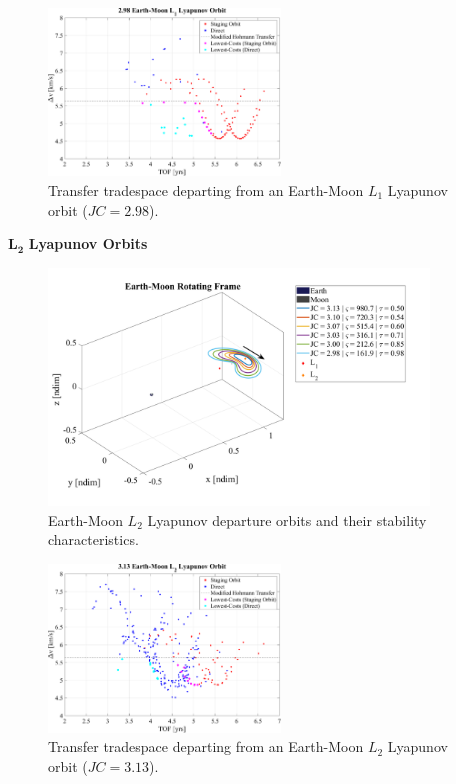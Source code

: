 \begin{figure}[ht]
    \centering
    \includegraphics[width=0.55\textwidth]{figures/TradeSpace_L1Lyapunov_2_98.pdf}
    \caption{Transfer tradespace departing from an Earth-Moon $L_{1}$ Lyapunov orbit ($JC=2.98$).}
\end{figure}
\clearpage

$\pmb{L_{2}}$ \textbf{Lyapunov Orbits}
\begin{figure}[ht]
    \centering
    \includegraphics[width=0.9\textwidth]{figures/L2LyapunovDepartureOrbits.pdf}
    \caption{Earth-Moon $L_{2}$ Lyapunov departure orbits and their stability characteristics.}
\end{figure}

\begin{figure}[ht]
    \centering
    \includegraphics[width=0.55\textwidth]{figures/TradeSpace_L2Lyapunov_3_13.pdf}
    \caption{Transfer tradespace departing from an Earth-Moon $L_{2}$ Lyapunov orbit ($JC=3.13$).}
\end{figure}


